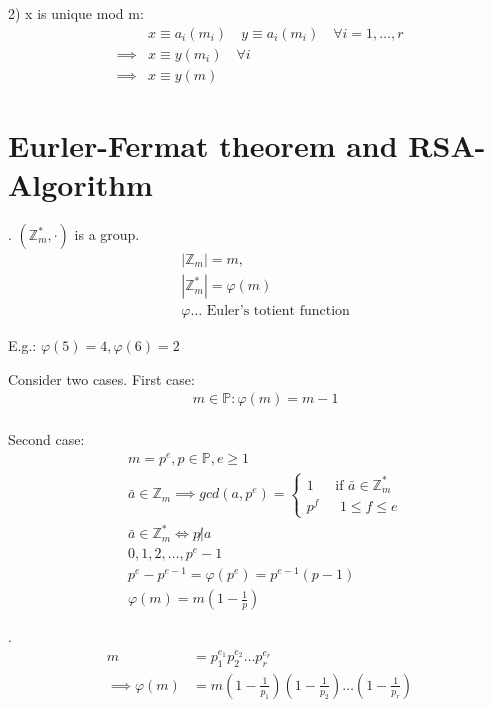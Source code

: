 2) x is unique mod m:
\begin{align*}
  & x \equiv a_i(m_i) \quad y \equiv a_i (m_i) \quad \forall i = 1,\ldots, r \\
  \implies & x \equiv y (m_i) \quad \forall i \\
  \implies & x \equiv y (m)
\end{align*}

\section{Eurler-Fermat theorem and RSA-Algorithm}

\Theorem.
$(\mathbb{Z}_m^{*}, \cdot)$ is a group.
\begin{align*}
  &|\mathbb{Z}_m| = m, \\
  &|\mathbb{Z}_m^{*}| = \varphi(m) \\
  &\varphi \ldots \text{ Euler's totient function}
\end{align*}

E.g.: $\varphi(5) = 4, \varphi(6) = 2$

Consider two cases. First case:
\begin{align*}
  &m \in \mathbb{P}: \varphi(m) = m-1 \\
\end{align*}

Second case:
\begin{align*}
  &m = p^e, p \in \mathbb{P}, e \geq 1 \\
  &\bar{a}\in \mathbb{Z}_m \implies gcd(a,p^e) = \begin{cases}
    1   &\text{ if $\bar{a} \in \mathbb{Z}_m^{*}$} \\
    p^f &\text{ $1 \leq f \leq e$} 
  \end{cases} \\
  &\bar{a}\in \mathbb{Z}_m^{*} \Leftrightarrow p \not|a \\
  & 0,1,2, \ldots, p^e -1\\
  & p^e - p^{e-1} = \varphi(p^e) = p^{e-1}(p-1) \\
  & \varphi(m) = m\left(1-\frac{1}{p}\right) 
\end{align*}

\Theorem.
\begin{align*}
  m &= p_1^{e_1} p_2^{e_2} \ldots p_r^{e_r} \\
  \implies \varphi(m) &= m \left( 1-\frac{1}{p_1} \right) \left( 1-\frac{1}{p_2} \right) \ldots \left( 1-\frac{1}{p_r} \right)
\end{align*}

